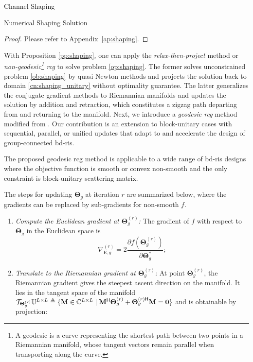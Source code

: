 \documentclass[journal]{IEEEtran}
\begin{document}
\begin{section}{Channel Shaping}
\begin{subsection}{Numerical Shaping Solution}
		\begin{proof}
			Please refer to Appendix~\ref{ap:shaping}.
		\end{proof}

		With Proposition \ref{pp:shaping}, one can apply the \emph{relax-then-project} method \cite{Shen2020a,Fang2023} or \emph{non-geodesic\footnote{A geodesic is a curve representing the shortest path between two points in a Riemannian manifold, whose tangent vectors remain parallel when transporting along the curve.} \gls{rcg}} \cite{Li2023c,Zhou2023} to solve problem \eqref{op:shaping}.
		The former solves unconstrained problem \eqref{ob:shaping} by quasi-Newton methods and projects the solution back to domain \eqref{cn:shaping_unitary} without optimality guarantee.
		The latter generalizes the conjugate gradient methods to Riemannian manifolds and updates the solution by addition and retraction, which constitutes a zigzag path departing from and returning to the manifold.
		Next, we introduce a \emph{geodesic \gls{rcg}} method modified from \cite{Abrudan2008,Abrudan2009}.
		Our contribution is an extension to block-unitary cases with sequential, parallel, or unified updates that adapt to and accelerate the design of group-connected \gls{bd}-\gls{ris}.
		\begin{remark}
			The proposed geodesic \gls{rcg} method is applicable to a wide range of \gls{bd}-\gls{ris} designs where the objective function is smooth or convex non-smooth and the only constraint is block-unitary scattering matrix.
		\end{remark}
		The steps for updating $\mathbf{\Theta}_g$ at iteration $r$ are summarized below, where the gradients can be replaced by sub-gradients for non-smooth $f$.
		\begin{enumerate}[label=(\roman*)]
			\item \emph{Compute the Euclidean gradient at $\mathbf{\Theta}_g^{(r)}$:} The gradient of $f$ with respect to $\mathbf{\Theta}_g$ in the Euclidean space is
				\begin{equation}
					\label{eq:gradient_eucl}
					\nabla_{\mathrm{E},g}^{(r)} = 2 \frac{\partial f(\mathbf{\Theta}_g^{(r)})}{\partial \mathbf{\Theta}_g^*};
				\end{equation}
			\item \emph{Translate to the Riemannian gradient at $\mathbf{\Theta}_g^{(r)}$:} At point $\mathbf{\Theta}_g^{(r)}$, the Riemannian gradient gives the steepest ascent direction on the manifold. It lies in the tangent space of the manifold $\mathcal{T}_{\smash{\mathbf{\Theta}_g^{(r)}}}\mathbb{U}^{L \times L} \triangleq \{\mathbf{M} \in \mathbb{C}^{L \times L} \mid \mathbf{M}^\mathsf{H} \mathbf{\Theta}_g^{(r)} + {\mathbf{\Theta}_g^{(r)\mathsf{H}}} \mathbf{M} = \mathbf{0}\}$ and is obtainable by projection:

\end{enumerate}
\end{subsection}
\end{section}
\end{document}
